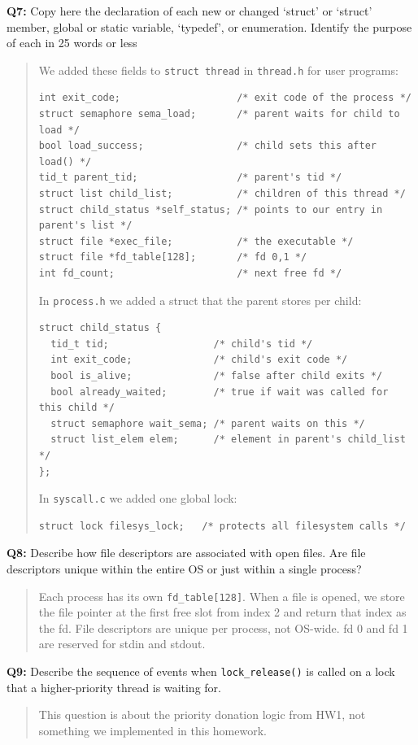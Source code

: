 \documentclass[a4paper,11pt]{paper}
\begin{document}
\textbf{Q7:} Copy here the declaration of each new or changed `struct' or `struct' member, global or static variable, `typedef', or enumeration.  Identify the purpose of each in 25 words or less
\begin{quote}
We added these fields to \texttt{struct thread} in \texttt{thread.h} for user programs:
\begin{verbatim}
int exit_code;                    /* exit code of the process */
struct semaphore sema_load;       /* parent waits for child to load */
bool load_success;                /* child sets this after load() */
tid_t parent_tid;                 /* parent's tid */
struct list child_list;           /* children of this thread */
struct child_status *self_status; /* points to our entry in parent's list */
struct file *exec_file;           /* the executable */
struct file *fd_table[128];       /* fd 0,1 */
int fd_count;                     /* next free fd */
\end{verbatim}

In \texttt{process.h} we added a struct that the parent stores per child:
\begin{verbatim}
struct child_status {
  tid_t tid;                  /* child's tid */
  int exit_code;              /* child's exit code */
  bool is_alive;              /* false after child exits */
  bool already_waited;        /* true if wait was called for this child */
  struct semaphore wait_sema; /* parent waits on this */
  struct list_elem elem;      /* element in parent's child_list */
};
\end{verbatim}

In \texttt{syscall.c} we added one global lock:
\begin{verbatim}
struct lock filesys_lock;   /* protects all filesystem calls */
\end{verbatim}
\end{quote}

\textbf{Q8:} Describe how file descriptors are associated with open files. Are file descriptors unique within the entire OS or just within a single process?
\begin{quote}
Each process has its own \texttt{fd\_table[128]}. When a file is opened,
we store the file pointer at the first free slot from index 2 and return
that index as the fd. File descriptors are unique per process, not OS-wide.
fd 0 and fd 1 are reserved for stdin and stdout.
\end{quote}

\textbf{Q9:} Describe the sequence of events when \texttt{lock\_release()} is called on a lock that a higher-priority thread is waiting for.
\begin{quote}
This question is about the priority donation logic from HW1, not something we implemented in this homework.
\end{quote}
\end{document}
